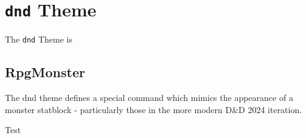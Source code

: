 \chapter{\texttt{dnd} Theme}

	The \texttt{dnd} Theme is 

	\section{RpgMonster}

		The dnd theme defines a special command which mimics the appearance of a monster statblock - particularly those in the more modern D\&D 2024 iteration. 

		\begin{multicols}{2}
		\begin{RpgMonster}{Test}
			
		\end{RpgMonster}
		\clearpage
		\Blindtext
	\end{multicols}




	
	
